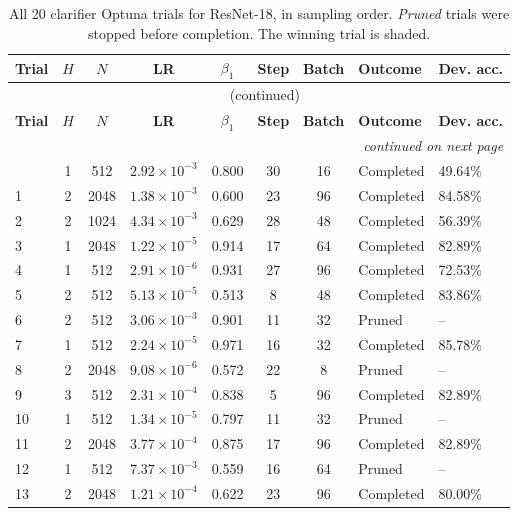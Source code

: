 {\footnotesize
\begin{longtable}{lccccccll}
\caption{All 20 clarifier Optuna trials for ResNet-18, in sampling order. \emph{Pruned} trials were stopped before completion. The winning trial is shaded.}
\label{tab:trials_resnet18} \\
\toprule
\textbf{Trial} & \textbf{$H$} & \textbf{$N$} & \textbf{LR} & \textbf{$\beta_1$} & \textbf{Step} & \textbf{Batch} & \textbf{Outcome} & \textbf{Dev. acc.} \\
\midrule
\endfirsthead
\multicolumn{9}{c}{\tablename\ \thetable{} (continued)} \\
\toprule
\textbf{Trial} & \textbf{$H$} & \textbf{$N$} & \textbf{LR} & \textbf{$\beta_1$} & \textbf{Step} & \textbf{Batch} & \textbf{Outcome} & \textbf{Dev. acc.} \\
\midrule
\endhead
\midrule
\multicolumn{9}{r}{\emph{continued on next page}} \\
\endfoot
\bottomrule
\endlastfoot
0 & 1 & 512 & $2.92\times10^{-3}$ & 0.800 & 30 & 16 & Completed & 49.64\% \\
1 & 2 & 2048 & $1.38\times10^{-3}$ & 0.600 & 23 & 96 & Completed & 84.58\% \\
2 & 2 & 1024 & $4.34\times10^{-3}$ & 0.629 & 28 & 48 & Completed & 56.39\% \\
3 & 1 & 2048 & $1.22\times10^{-5}$ & 0.914 & 17 & 64 & Completed & 82.89\% \\
4 & 1 & 512 & $2.91\times10^{-6}$ & 0.931 & 27 & 96 & Completed & 72.53\% \\
5 & 2 & 512 & $5.13\times10^{-5}$ & 0.513 & 8 & 48 & Completed & 83.86\% \\
6 & 2 & 512 & $3.06\times10^{-3}$ & 0.901 & 11 & 32 & Pruned & -- \\
\rowcolor{gray!15} 7 & 1 & 512 & $2.24\times10^{-5}$ & 0.971 & 16 & 32 & Completed & 85.78\% \\
8 & 2 & 2048 & $9.08\times10^{-6}$ & 0.572 & 22 & 8 & Pruned & -- \\
9 & 3 & 512 & $2.31\times10^{-4}$ & 0.838 & 5 & 96 & Completed & 82.89\% \\
10 & 1 & 512 & $1.34\times10^{-5}$ & 0.797 & 11 & 32 & Pruned & -- \\
11 & 2 & 2048 & $3.77\times10^{-4}$ & 0.875 & 17 & 96 & Completed & 82.89\% \\
12 & 1 & 512 & $7.37\times10^{-3}$ & 0.559 & 16 & 64 & Pruned & -- \\
13 & 2 & 2048 & $1.21\times10^{-4}$ & 0.622 & 23 & 96 & Completed & 80.00\% \\

\end{longtable}}
